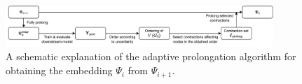 \begin{figure}
  \centering
  \includegraphics[width=0.9\textwidth]{images/adaptive-prolongation/adaptive-prolongation.pdf}
  \caption{A schematic explanation of the adaptive prolongation algorithm for obtaining the embedding \( \Psi_{i} \) from \( \Psi_{i + 1} \).}
  \label{fig:adaptive-prolongation}
\end{figure}
